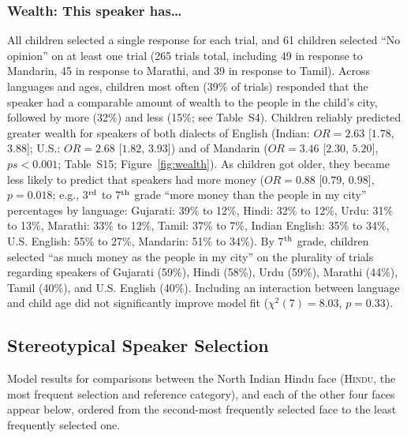 \documentclass{foushee-adapted-preprint}
\newcommand{\wealthmeanstab}{S4}
\newcommand{\wealthmodeltab}{S15}
\begin{document}
\subsubsection{Wealth: This speaker has\ldots} 
All children selected a single response for each trial, and 61 children selected ``No opinion'' on at least one trial (265 trials total, including 49 in response to Mandarin, 45 in response to Marathi, and 39 in response to Tamil). 
Across languages and ages, children most often (39\% of trials) responded that the speaker had a comparable amount of wealth to the people in the child's city, followed by more (32\%) and less (15\%; see %
Table~\wealthmeanstab).
Children reliably predicted greater wealth for speakers of both dialects of English (Indian: $OR=2.63$ [$1.78$, $3.88$]; U.S.: $OR=2.68$ [$1.82$, $3.93$]) and of Mandarin ($OR=3.46$ [$2.30$, $5.20$], $ps<0.001$; Table~\wealthmodeltab; Figure~\ref{fig:wealth}). 
As children got older, they became less likely to predict that speakers had more money ($OR=0.88$ [$0.79$, $0.98$], $p=0.018$; e.g., 3$^{\textnormal{rd}}$ to 7$^{\textnormal{th}}$ grade ``more money than the people in my city'' percentages by language: Gujarati: 39\% to 12\%, Hindi: 32\% to 12\%, Urdu: 31\% to 13\%, Marathi: 33\% to 12\%, Tamil: 37\% to 7\%, Indian English: 35\% to 34\%, U.S. English: 55\% to 27\%, Mandarin: 51\% to 34\%). 
By 7$^{\textnormal{th}}$ grade, children selected ``as much money as the people in my city'' on the plurality of trials regarding speakers of Gujarati (59\%), Hindi (58\%), Urdu (59\%), Marathi (44\%), Tamil (40\%), and U.S. English (40\%). 
Including an interaction between language and child age did not significantly improve model fit ($\chi^{2}(7)=8.03$, $p=0.33$).

\subsection{Stereotypical Speaker Selection}
Model results for comparisons between the North Indian Hindu face (\textsc{Hindu}, the most frequent selection and reference category), and each of the other four faces appear below, ordered from the second-most frequently selected face to the least frequently selected one. 
\end{document}

